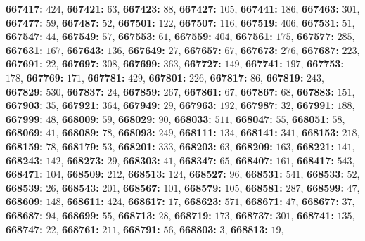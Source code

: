 \textsf{\bfseries 667417:} $424$, \textsf{\bfseries 667421:} $63$, \textsf{\bfseries 667423:} $88$, \textsf{\bfseries 667427:} $105$, \textsf{\bfseries 667441:} $186$, \textsf{\bfseries 667463:} $301$, \textsf{\bfseries 667477:} $59$, \textsf{\bfseries 667487:} $52$, \textsf{\bfseries 667501:} $122$, \textsf{\bfseries 667507:} $116$, \textsf{\bfseries 667519:} $406$, \textsf{\bfseries 667531:} $51$, \textsf{\bfseries 667547:} $44$, \textsf{\bfseries 667549:} $57$, \textsf{\bfseries 667553:} $61$, \textsf{\bfseries 667559:} $404$, \textsf{\bfseries 667561:} $175$, \textsf{\bfseries 667577:} $285$, \textsf{\bfseries 667631:} $167$, \textsf{\bfseries 667643:} $136$, \textsf{\bfseries 667649:} $27$, \textsf{\bfseries 667657:} $67$, \textsf{\bfseries 667673:} $276$, \textsf{\bfseries 667687:} $223$, \textsf{\bfseries 667691:} $22$, \textsf{\bfseries 667697:} $308$, \textsf{\bfseries 667699:} $363$, \textsf{\bfseries 667727:} $149$, \textsf{\bfseries 667741:} $197$, \textsf{\bfseries 667753:} $178$, \textsf{\bfseries 667769:} $171$, \textsf{\bfseries 667781:} $429$, \textsf{\bfseries 667801:} $226$, \textsf{\bfseries 667817:} $86$, \textsf{\bfseries 667819:} $243$, \textsf{\bfseries 667829:} $530$, \textsf{\bfseries 667837:} $24$, \textsf{\bfseries 667859:} $267$, \textsf{\bfseries 667861:} $67$, \textsf{\bfseries 667867:} $68$, \textsf{\bfseries 667883:} $151$, \textsf{\bfseries 667903:} $35$, \textsf{\bfseries 667921:} $364$, \textsf{\bfseries 667949:} $29$, \textsf{\bfseries 667963:} $192$, \textsf{\bfseries 667987:} $32$, \textsf{\bfseries 667991:} $188$, \textsf{\bfseries 667999:} $48$, \textsf{\bfseries 668009:} $59$, \textsf{\bfseries 668029:} $90$, \textsf{\bfseries 668033:} $511$, \textsf{\bfseries 668047:} $55$, \textsf{\bfseries 668051:} $58$, \textsf{\bfseries 668069:} $41$, \textsf{\bfseries 668089:} $78$, \textsf{\bfseries 668093:} $249$, \textsf{\bfseries 668111:} $134$, \textsf{\bfseries 668141:} $341$, \textsf{\bfseries 668153:} $218$, \textsf{\bfseries 668159:} $78$, \textsf{\bfseries 668179:} $53$, \textsf{\bfseries 668201:} $333$, \textsf{\bfseries 668203:} $63$, \textsf{\bfseries 668209:} $163$, \textsf{\bfseries 668221:} $141$, \textsf{\bfseries 668243:} $142$, \textsf{\bfseries 668273:} $29$, \textsf{\bfseries 668303:} $41$, \textsf{\bfseries 668347:} $65$, \textsf{\bfseries 668407:} $161$, \textsf{\bfseries 668417:} $543$, \textsf{\bfseries 668471:} $104$, \textsf{\bfseries 668509:} $212$, \textsf{\bfseries 668513:} $124$, \textsf{\bfseries 668527:} $96$, \textsf{\bfseries 668531:} $541$, \textsf{\bfseries 668533:} $52$, \textsf{\bfseries 668539:} $26$, \textsf{\bfseries 668543:} $201$, \textsf{\bfseries 668567:} $101$, \textsf{\bfseries 668579:} $105$, \textsf{\bfseries 668581:} $287$, \textsf{\bfseries 668599:} $47$, \textsf{\bfseries 668609:} $148$, \textsf{\bfseries 668611:} $424$, \textsf{\bfseries 668617:} $17$, \textsf{\bfseries 668623:} $571$, \textsf{\bfseries 668671:} $47$, \textsf{\bfseries 668677:} $37$, \textsf{\bfseries 668687:} $94$, \textsf{\bfseries 668699:} $55$, \textsf{\bfseries 668713:} $28$, \textsf{\bfseries 668719:} $173$, \textsf{\bfseries 668737:} $301$, \textsf{\bfseries 668741:} $135$, \textsf{\bfseries 668747:} $22$, \textsf{\bfseries 668761:} $211$, \textsf{\bfseries 668791:} $56$, \textsf{\bfseries 668803:} $3$, \textsf{\bfseries 668813:} $19$, 

